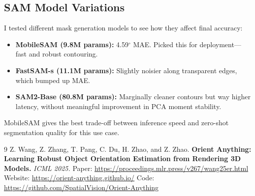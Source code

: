 \documentclass[11pt,a4paper]{article}
\begin{document}
\subsection{SAM Model Variations}
I tested different mask generation models to see how they affect final accuracy:
\begin{itemize}
    \item \textbf{MobileSAM (9.8M params):} 4.59$^\circ$ MAE. Picked this for deployment---fast and robust contouring.
    \item \textbf{FastSAM-s (11.1M params):} Slightly noisier along transparent edges, which bumped up MAE.
    \item \textbf{SAM2-Base (80.8M params):} Marginally cleaner contours but way higher latency, without meaningful improvement in PCA moment stability.
\end{itemize}
MobileSAM gives the best trade-off between inference speed and zero-shot segmentation quality for this use case.

\begin{thebibliography}{9}
Z. Wang, Z. Zhang, T. Pang, C. Du, H. Zhao, and Z. Zhao. \newblock
\textbf{Orient Anything: Learning Robust Object Orientation Estimation from Rendering 3D
Models.} \newblock
\textit{ICML 2025.} \newblock
Paper: \url{https://proceedings.mlr.press/v267/wang25er.html} \newblock
Website: \url{https://orient-anything.github.io/} \newblock
Code: \url{https://github.com/SpatialVision/Orient-Anything}
\end{thebibliography}
\end{document}

